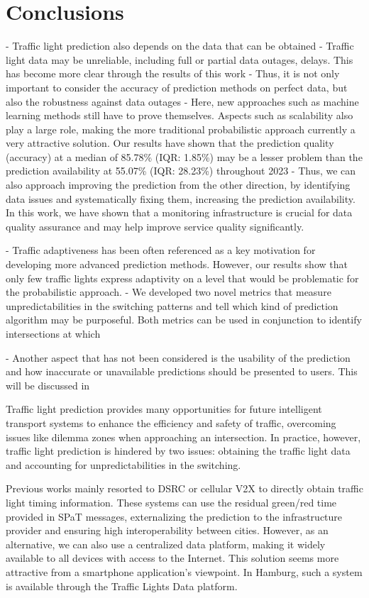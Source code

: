 \section{Conclusions}

- Traffic light prediction also depends on the data that can be obtained
- Traffic light data may be unreliable, including full or partial data outages, delays. This has become more clear through the results of this work
- Thus, it is not only important to consider the accuracy of prediction methods on perfect data, but also the robustness against data outages
- Here, new approaches such as machine learning methods still have to prove themselves. Aspects such as scalability also play a large role, making the more traditional probabilistic approach currently a very attractive solution. Our results have shown that the prediction quality (accuracy) at a median of 85.78\% (IQR: 1.85\%) may be a lesser problem than the prediction availability at 55.07\% (IQR: 28.23\%) throughout 2023
- Thus, we can also approach improving the prediction from the other direction, by identifying data issues and systematically fixing them, increasing the prediction availability. In this work, we have shown that a monitoring infrastructure is crucial for data quality assurance and may help improve service quality significantly.

- Traffic adaptiveness has been often referenced as a key motivation for developing more advanced prediction methods. However, our results show that only few traffic lights express adaptivity on a level that would be problematic for the probabilistic approach.
- We developed two novel metrics that measure unpredictabilities in the switching patterns and tell which kind of prediction algorithm may be purposeful. Both metrics can be used in conjunction to identify intersections at which 

- Another aspect that has not been considered is the usability of the prediction and how inaccurate or unavailable predictions should be presented to users. This will be discussed in 

Traffic light prediction provides many opportunities for future intelligent transport systems to enhance the efficiency and safety of traffic, overcoming issues like dilemma zones when approaching an intersection. In practice, however, traffic light prediction is hindered by two issues: obtaining the traffic light data and accounting for unpredictabilities in the switching. 

Previous works mainly resorted to DSRC or cellular V2X to directly obtain traffic light timing information. These systems can use the residual green/red time provided in SPaT messages, externalizing the prediction to the infrastructure provider and ensuring high interoperability between cities. However, as an alternative, we can also use a centralized data platform, making it widely available to all devices with access to the Internet. This solution seems more attractive from a smartphone application's viewpoint. In Hamburg, such a system is available through the Traffic Lights Data platform.


